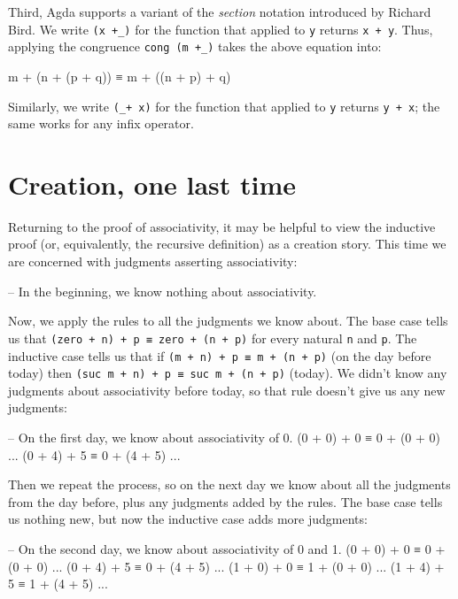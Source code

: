 Third, Agda supports a variant of the \emph{section} notation introduced
by Richard Bird. We write \texttt{(x\ +\_)} for the function that
applied to \texttt{y} returns \texttt{x\ +\ y}. Thus, applying the
congruence \texttt{cong\ (m\ +\_)} takes the above equation into:

\begin{myDisplay}
m + (n + (p + q)) ≡ m + ((n + p) + q)
\end{myDisplay}

Similarly, we write \texttt{(\_+\ x)} for the function that applied to
\texttt{y} returns \texttt{y\ +\ x}; the same works for any infix
operator.

\hypertarget{creation-one-last-time}{%
\section{Creation, one last time}\label{creation-one-last-time}}

Returning to the proof of associativity, it may be helpful to view the
inductive proof (or, equivalently, the recursive definition) as a
creation story. This time we are concerned with judgments asserting
associativity:

\begin{myDisplay}
 -- In the beginning, we know nothing about associativity.
\end{myDisplay}

Now, we apply the rules to all the judgments we know about. The base
case tells us that \texttt{(zero\ +\ n)\ +\ p\ ≡\ zero\ +\ (n\ +\ p)}
for every natural \texttt{n} and \texttt{p}. The inductive case tells us
that if \texttt{(m\ +\ n)\ +\ p\ ≡\ m\ +\ (n\ +\ p)} (on the day before
today) then \texttt{(suc\ m\ +\ n)\ +\ p\ ≡\ suc\ m\ +\ (n\ +\ p)}
(today). We didn't know any judgments about associativity before today,
so that rule doesn't give us any new judgments:

\begin{myDisplay}
-- On the first day, we know about associativity of 0.
(0 + 0) + 0 ≡ 0 + (0 + 0)   ...   (0 + 4) + 5 ≡ 0 + (4 + 5)   ...
\end{myDisplay}

Then we repeat the process, so on the next day we know about all the
judgments from the day before, plus any judgments added by the rules.
The base case tells us nothing new, but now the inductive case adds more
judgments:

\begin{myDisplay}
-- On the second day, we know about associativity of 0 and 1.
(0 + 0) + 0 ≡ 0 + (0 + 0)   ...   (0 + 4) + 5 ≡ 0 + (4 + 5)   ...
(1 + 0) + 0 ≡ 1 + (0 + 0)   ...   (1 + 4) + 5 ≡ 1 + (4 + 5)   ...
\end{myDisplay}

